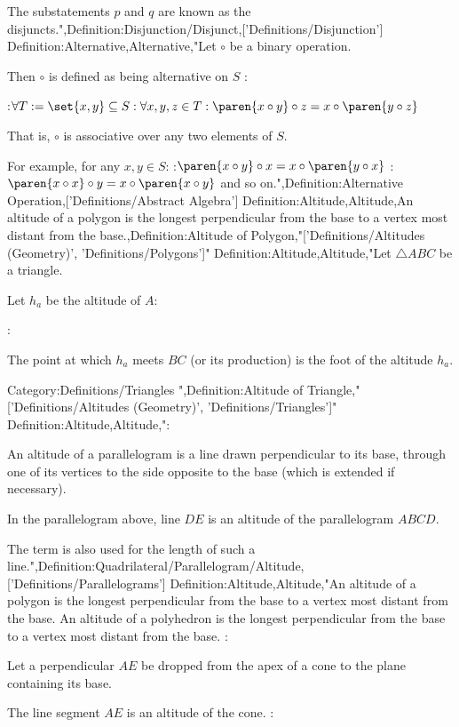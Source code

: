 The substatements $p$ and $q$ are known as the disjuncts.",Definition:Disjunction/Disjunct,['Definitions/Disjunction']
Definition:Alternative,Alternative,"Let $\circ$ be a binary operation.


Then $\circ$ is defined as being alternative on $S$ :

:$\forall T := \set {x, y} \subseteq S: \forall x, y, z \in T: \paren {x \circ y} \circ z = x \circ \paren {y \circ z}$

That is, $\circ$ is associative over any two elements of $S$.


For example, for any $x, y \in S$:
:$\paren {x \circ y} \circ x = x \circ \paren {y \circ x}$
:$\paren {x \circ x} \circ y = x \circ \paren {x \circ y}$
and so on.",Definition:Alternative Operation,['Definitions/Abstract Algebra']
Definition:Altitude,Altitude,An altitude of a polygon is the longest perpendicular from the base to a vertex most distant from the base.,Definition:Altitude of Polygon,"['Definitions/Altitudes (Geometry)', 'Definitions/Polygons']"
Definition:Altitude,Altitude,"Let $\triangle ABC$ be a triangle.

Let $h_a$ be the altitude of $A$:

:


The point at which $h_a$ meets $BC$ (or its production) is the foot of the altitude $h_a$.


Category:Definitions/Triangles
",Definition:Altitude of Triangle,"['Definitions/Altitudes (Geometry)', 'Definitions/Triangles']"
Definition:Altitude,Altitude,":

An altitude of a parallelogram is a line drawn perpendicular to its base, through one of its vertices to the side opposite to the base (which is extended if necessary).

In the parallelogram above, line $DE$ is an altitude of the parallelogram $ABCD$.


The term is also used for the length of such a line.",Definition:Quadrilateral/Parallelogram/Altitude,['Definitions/Parallelograms']
Definition:Altitude,Altitude,"An altitude of a polygon is the longest perpendicular from the base to a vertex most distant from the base.
An altitude of a polyhedron is the longest perpendicular from the base to a vertex most distant from the base.
:

Let a perpendicular $AE$ be dropped from the apex of a cone to the plane containing its base.

The line segment $AE$ is an altitude of the cone.
:

